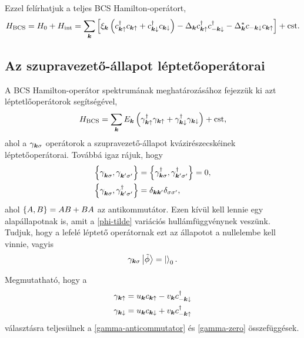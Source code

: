 \documentclass[a4paper,12pt,titlepage]{article}
\newcommand{\KK}{{\vb*{k}}}
\newcommand{\phantomdagger}{{\phantom{\dagger}}}
\begin{document}
Ezzel felírhatjuk a teljes BCS Hamilton-operátort,
\begin{equation}
	H_\text{BCS} = H_0 + H_\text{int} = \sum\limits_\KK \left[ \xi_\KK \left( c_{\KK \uparrow}^\dagger c_{\KK \uparrow} + c_{\KK \downarrow}^\dagger c_{\KK \downarrow} \right) - \Delta_\KK c_{\KK \uparrow}^\dagger c_{-\KK \downarrow}^\dagger - \Delta_\KK^* c_{-\KK \downarrow} c_{\KK \uparrow} \right] + \text{cst}.
\end{equation}


\subsection{Az szupravezető-állapot léptetőoperátorai}

A BCS Hamilton-operátor spektrumának meghatározásához fejezzük ki azt léptetlőoperátorok segítségével,
\begin{equation} \label{H-BCS}
	H_\text{BCS} = \sum\limits_\KK E_\KK \left( \gamma_{\KK \uparrow}^\dagger \gamma_{\KK \uparrow} + \gamma_{\KK \downarrow}^\dagger \gamma_{\KK \downarrow} \right) + \text{cst},
\end{equation}
ahol a $\gamma_{\KK \sigma}$ operátorok a szupravezető-állapot kvázirészecskéinek léptetőoperátorai.  Továbbá igaz rájuk, hogy
\begin{equation} \label{gamma-anticommutator}
\begin{split}
	\anticommutator{\gamma_{\KK \sigma}^\phantomdagger}{\gamma_{\KK^\prime \sigma^\prime}^\phantomdagger} & = \anticommutator{\gamma_{\KK \sigma}^\dagger}{\gamma_{\KK^\prime \sigma^\prime}^\dagger} = 0, \\
	\anticommutator{\gamma_{\KK \sigma}^\phantomdagger}{\gamma_{\KK^\prime \sigma^\prime}^\dagger} & = \delta_{\KK \KK^\prime} \delta_{\sigma \sigma^\prime},
\end{split}
\end{equation}
ahol $\anticommutator{A}{B} = AB + BA$ az antikommutátor.  Ezen kívül kell lennie egy alapállapotnak is, amit a \eqref{phi-tilde} variációs hullámfüggvénynek veszünk.  Tudjuk, hogy a lefelé léptető operátornak ezt az állapotot a nullelembe kell vinnie, vagyis
\begin{equation} \label{gamma-zero}
	\gamma_{\KK \sigma} \ket{\tilde{\phi}} = \ket{}_0.
\end{equation}

Megmutatható, hogy a
\begin{equation} \label{gamma-def}
\begin{split}
	\gamma_{\KK \uparrow} & = u_\KK c_{\KK \uparrow} - v_\KK c_{-\KK \downarrow}^\dagger \\
	\gamma_{\KK \downarrow} & = u_\KK c_{\KK \downarrow} + v_\KK c_{-\KK \uparrow}^\dagger
\end{split}
\end{equation}
választásra teljesülnek a \eqref{gamma-anticommutator} és \eqref{gamma-zero} összefüggések.
\end{document}

